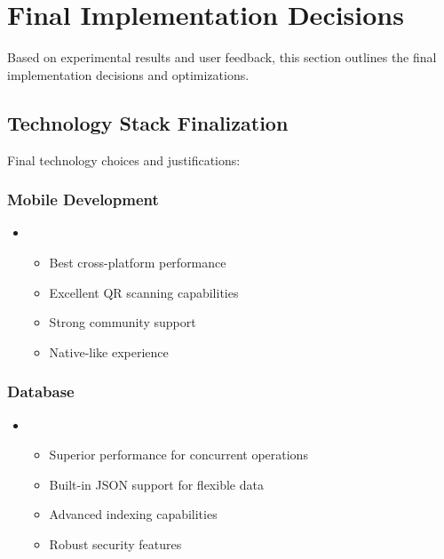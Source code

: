 \section{Final Implementation Decisions}
\begin{warningbox}
Based on experimental results and user feedback, this section outlines the final implementation decisions and optimizations.
\end{warningbox}

\subsection{Technology Stack Finalization}
\textcolor{TextBlack}{
    Final technology choices and justifications:

    \subsubsection{Mobile Development}
    \begin{itemize}
        \item {}
        \begin{itemize}
            \item Best cross-platform performance
            \item Excellent QR scanning capabilities
            \item Strong community support
            \item Native-like experience
        \end{itemize}
    \end{itemize}

    \subsubsection{Database}
    \begin{itemize}
        \item {}
        \begin{itemize}
            \item Superior performance for concurrent operations
            \item Built-in JSON support for flexible data
            \item Advanced indexing capabilities
            \item Robust security features
        \end{itemize}
    \end{itemize}
}

